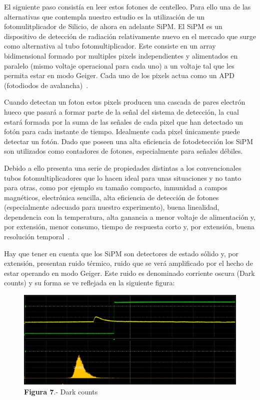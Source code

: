 El siguiente paso consistía en leer estos fotones de centelleo. Para ello una de las alternativas que contempla nuestro estudio es la utilización de un fotomulitplicador de Silicio, de ahora en adelante SiPM. El SiPM es un dispositivo de detección de radiación relativamente nuevo en el mercado que surge como alternativa al tubo fotomultiplicador. Este consiste en un array bidimensional formado por multiples pixels independientes y alimentados en paralelo (mismo voltaje operacional para cada uno) a un voltaje tal que les permita estar en modo Geiger. Cada uno de los pixels actua como un APD (fotodiodos de avalancha)~\cite{TFMSiPM2}.

Cuando detectan un foton estos pixels producen una cascada de pares electrón hueco que pasará a formar parte de la señal del sistema de detección, la cual estará formada por la suma de las señales de cada pixel que han detectado un fotón para cada instante de tiempo. Idealmente cada pixel únicamente puede detectar un fotón. Dado que poseen una alta eficiencia de fotodetección los SiPM son utilizados como contadores de fotones, especialmente para señales débiles.

Debido a ello presenta una serie de propiedades distintas a los convencionales tubos fotomultiplicadores que lo hacen ideal para unas situaciones y no tanto para otras, como por ejemplo su tamaño compacto, inmunidad a campos magnéticos, electrónica sencilla, alta eficiencia de detección de fotones (especialmente adecuado para nuestro experimento), buena linealidad, dependencia con la temperatura, alta ganancia a menor voltaje de alimentación y, por extensión, menor consumo, tiempo de respuesta corto y, por extensión, buena resolución temporal~\cite{AMFNP}.

Hay que tener en cuenta que los SiPM son detectores de estado sólido y, por extensión, presentan ruido térmico, ruido que se verá amplificado por el hecho de estar operando en modo Geiger. Este ruido es denominado corriente oscura (Dark counts) y su forma se ve reflejada en la siguiente figura:

\begin{figure}[hbtp]
\centering
\includegraphics[scale=0.2]{pedestal.png}
\caption{\textbf{Figura 7}.- Dark counts}
\end{figure}

